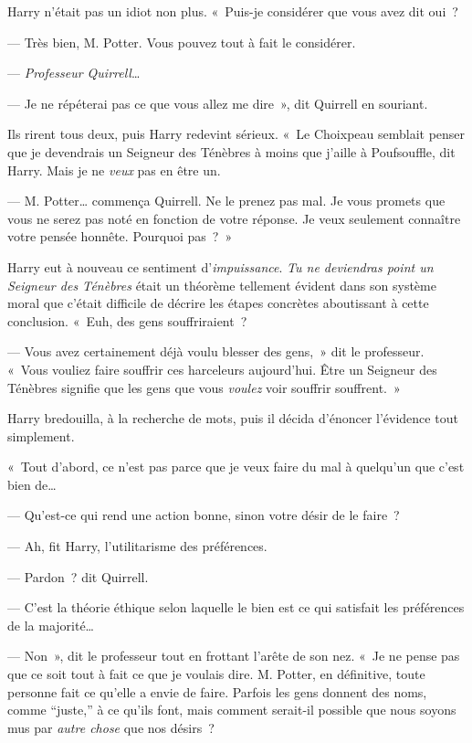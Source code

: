 Harry n'était pas un idiot non plus.
«~Puis-je considérer que vous avez dit oui~?

--- Très bien, M. Potter.
Vous pouvez tout à fait le considérer.

--- \emph{Professeur Quirrell}…

--- Je ne répéterai pas ce que vous allez me dire~», dit Quirrell en souriant.

Ils rirent tous deux, puis Harry redevint sérieux.
«~Le Choixpeau semblait penser que je devendrais un Seigneur des Ténèbres à moins que j'aille à Poufsouffle, dit Harry.
Mais je ne \emph{veux} pas en être un.

--- M. Potter… commença Quirrell.
Ne le prenez pas mal.
Je vous promets que vous ne serez pas noté en fonction de votre réponse.
Je veux seulement connaître votre pensée honnête.
Pourquoi pas~?~»

Harry eut à nouveau ce sentiment d'\emph{impuissance}.
\emph{Tu ne deviendras point un Seigneur des Ténèbres} était un théorème tellement évident dans son système moral que c'était difficile de décrire les étapes concrètes aboutissant à cette conclusion.
«~Euh, des gens souffriraient~?

--- Vous avez certainement déjà voulu blesser des gens,~» dit le professeur.
«~Vous vouliez faire souffrir ces harceleurs aujourd'hui.
Être un Seigneur des Ténèbres signifie que les gens que vous \emph{voulez} voir souffrir souffrent.~»

Harry bredouilla, à la recherche de mots, puis il décida d'énoncer l'évidence tout simplement.

«~Tout d'abord, ce n'est pas parce que je veux faire du mal à quelqu'un que c'est bien de…

--- Qu'est-ce qui rend une action bonne, sinon votre désir de le faire~?

--- Ah, fit Harry, l'utilitarisme des préférences.

--- Pardon~? dit Quirrell.

--- C'est la théorie éthique selon laquelle le bien est ce qui satisfait les préférences de la majorité…

--- Non~», dit le professeur tout en frottant l'arête de son nez.
«~Je ne pense pas que ce soit tout à fait ce que je voulais dire.
M. Potter, en définitive, toute personne fait ce qu'elle a envie de faire.
Parfois les gens donnent des noms, comme “juste,” à ce qu'ils font, mais comment serait-il possible que nous soyons mus par \emph{autre chose} que nos désirs~?

